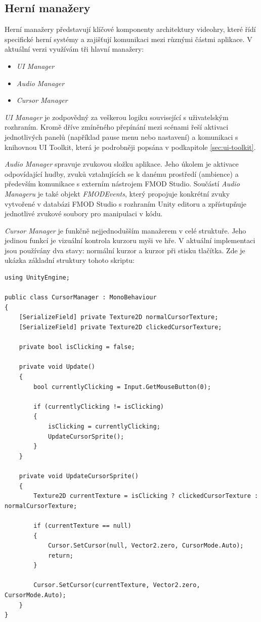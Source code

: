 \subsection{Herní manažery}
\label{sec:herni-manazery}
Herní manažery představují klíčové komponenty architektury videohry, které řídí specifické herní systémy a zajišťují komunikaci mezi různými částmi aplikace. V aktuální verzi využívám tři hlavní manažery:
\begin{itemize}
    \item \emph{UI Manager}
    \item \emph{Audio Manager}
    \item \emph{Cursor Manager}
\end{itemize}

\emph{UI Manager} je zodpovědný za veškerou logiku související s uživatelským rozhraním. Kromě dříve zmíněného přepínání mezi scénami řeší aktivaci jednotlivých panelů (například pause menu nebo nastavení) a komunikaci s knihovnou UI Toolkit, která je podrobněji popsána v podkapitole \ref{sec:ui-toolkit}.

\emph{Audio Manager} spravuje zvukovou složku aplikace. Jeho úkolem je aktivace odpovídající hudby, zvuků vztahujících se k danému prostředí (ambience) a především komunikace s externím nástrojem FMOD Studio. Součástí \emph{Audio Manageru} je také objekt \emph{FMODEvents}, který propojuje konkrétní zvuky vytvořené v databázi FMOD Studio s rozhraním Unity editoru a zpřístupňuje jednotlivé zvukové soubory pro manipulaci v kódu.

\emph{Cursor Manager} je funkčně nejjednodušším manažerem v celé struktuře. Jeho jedinou funkcí je vizuální kontrola kurzoru myši ve hře. V aktuální implementaci jsou používány dva stavy: normální kurzor a kurzor při stisku tlačítka. Zde je ukázka základní struktury tohoto skriptu:

\begin{lstlisting}[caption={CursorManager.cs}, label={lst:CursorManager}, frame=none, backgroundcolor=\color{white}]
using UnityEngine;

public class CursorManager : MonoBehaviour
{
    [SerializeField] private Texture2D normalCursorTexture;
    [SerializeField] private Texture2D clickedCursorTexture;

    private bool isClicking = false;

    private void Update()
    {
        bool currentlyClicking = Input.GetMouseButton(0);
        
        if (currentlyClicking != isClicking)
        {
            isClicking = currentlyClicking;
            UpdateCursorSprite();
        }
    }

    private void UpdateCursorSprite()
    {
        Texture2D currentTexture = isClicking ? clickedCursorTexture : normalCursorTexture;
        
        if (currentTexture == null)
        {
            Cursor.SetCursor(null, Vector2.zero, CursorMode.Auto);
            return;
        }
        
        Cursor.SetCursor(currentTexture, Vector2.zero, CursorMode.Auto);
    }
}
\end{lstlisting}

